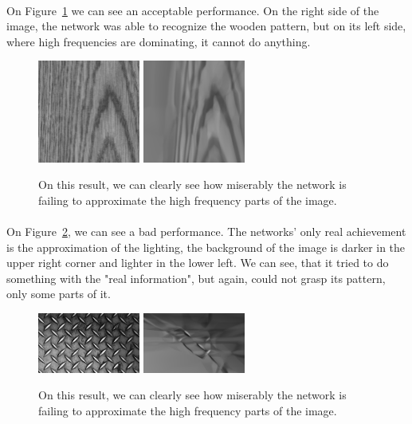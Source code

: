 \documentclass[a4paper]{article}
\begin{document}
\paragraph{}On Figure~\ref{fig:wood} we can see an acceptable performance. On the right side of the image, the network was able to recognize the wooden pattern, but on its left side, where high frequencies are dominating, it cannot do anything.

\begin{figure}[h]
\centering
\includegraphics[width=0.3\textwidth]{wood.jpg}
\includegraphics[width=0.3\textwidth]{woodo.png}
\caption{\label{fig:wood}On this result, we can clearly see how miserably the network is failing to approximate the high frequency parts of the image.}
\end{figure}

\paragraph{}On Figure~\ref{fig:steel}, we can see a bad performance. The networks' only real achievement is the approximation of the lighting, the background of the image is darker in the upper right corner and lighter in the lower left. We can see, that it tried to do something with the "real information", but again, could not grasp its pattern, only some parts of it. 

\begin{figure}[h]
\centering
\includegraphics[width=0.3\textwidth]{steel.jpeg}
\includegraphics[width=0.3\textwidth]{steelo.png}
\caption{\label{fig:steel}On this result, we can clearly see how miserably the network is failing to approximate the high frequency parts of the image.}
\end{figure}
\end{document}
